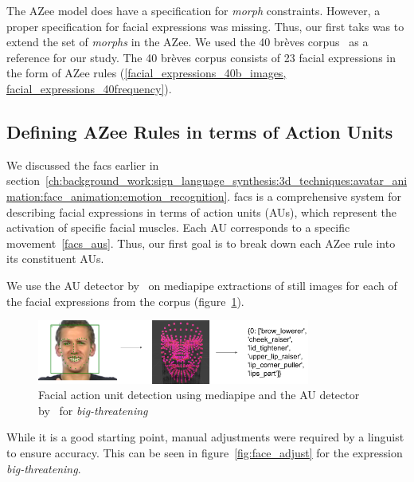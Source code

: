\documentclass[../../main]{subfiles}
\begin{document}
The AZee model does have a specification for \emph{morph} constraints. However, a proper specification for facial expressions was missing. Thus, our first taks was to extend the set of \emph{morphs} in the AZee. We used the 40 brèves corpus~\cite{challant2024extending, challant2022first} as a reference for our study. The 40 brèves corpus consists of 23 facial expressions in the form of AZee rules (\ref{facial_expressions_40b_images, facial_expressions_40frequency}).

\subsection{Defining AZee Rules in terms of Action Units}
\label{ch:facial_expressions:defining_azee_rules_in_terms_of_action_units}

We discussed the \gls{facs} earlier in section~\ref{ch:background_work:sign_language_synthesis:3d_techniques:avatar_animation:face_animation:emotion_recognition}. \gls{facs} is a comprehensive system for describing facial expressions in terms of action units (AUs), which represent the activation of specific facial muscles. Each AU corresponds to a specific movement~\ref{facs_aus}. Thus, our first goal is to break down each AZee rule into its constituent AUs. 

We use the AU detector by~\cite{luo2022learning} on mediapipe extractions of still images for each of the facial expressions from the corpus (figure~\ref{ch:facial_expressions:fig:face_detect}).

\begin{figure}[h]
    \centering
    \includegraphics[width=0.8\textwidth]{chapters/facial_expressions/images/face_detect.png}
    \caption{Facial action unit detection using mediapipe and the AU detector by~\cite{luo2022learning} for \emph{big-threatening}}
    \label{ch:facial_expressions:fig:face_detect}
\end{figure}

While it is a good starting point, manual adjustments were required by a linguist to ensure accuracy. This can be seen in figure~\ref{fig:face_adjust} for the expression \emph{big-threatening}.
\end{document}
